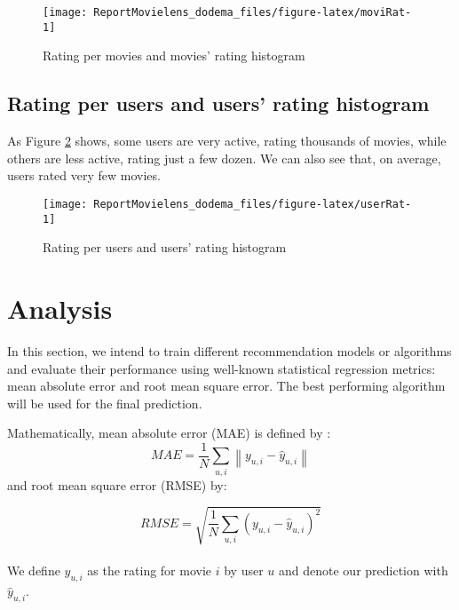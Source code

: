 \documentclass[
]{article}
\begin{document}
\begin{figure}[H]

{\centering \texttt{[image: ReportMovielens\_dodema\_files/figure-latex/moviRat-1]} 

}

\caption{Rating per movies and movies' rating histogram}\label{fig:moviRat}
\end{figure}

\subsection{Rating per users and users' rating histogram}\label{rating-per-users-and-users-rating-histogram}

As Figure \ref{fig:userRat} shows, some users are very active, rating thousands of movies, while others are less active, rating just a few dozen. We can also see that, on average, users rated very few movies.

\begin{figure}[H]

{\centering \texttt{[image: ReportMovielens\_dodema\_files/figure-latex/userRat-1]} 

}

\caption{Rating per users and users' rating histogram}\label{fig:userRat}
\end{figure}

\section{Analysis}\label{analysis}

In this section, we intend to train different recommendation models or algorithms and evaluate their performance using well-known statistical regression metrics: mean absolute error and root mean square error. The best performing algorithm will be used for the final prediction.

Mathematically, mean absolute error (MAE) is defined by :
\begin{equation} 
    MAE = \frac{1}{N}\sum_{u,i}\left\| y_{u,i}-\hat{y}_{u,i}\right\|
  \label{eq:metricMAE}
\end{equation}
and root mean square error (RMSE) by:

\begin{equation} 
    RMSE = \sqrt{\frac{1}{N}\sum_{u,i}\left(y_{u,i}-\hat{y}_{u,i}\right)^{2}}
  \label{eq:metricRMSE}
\end{equation}\\
We define \(y_{u,i}\) as the rating for movie \(i\) by user \(u\) and denote our prediction with \(\hat{y}_{u,i}\).
\end{document}

